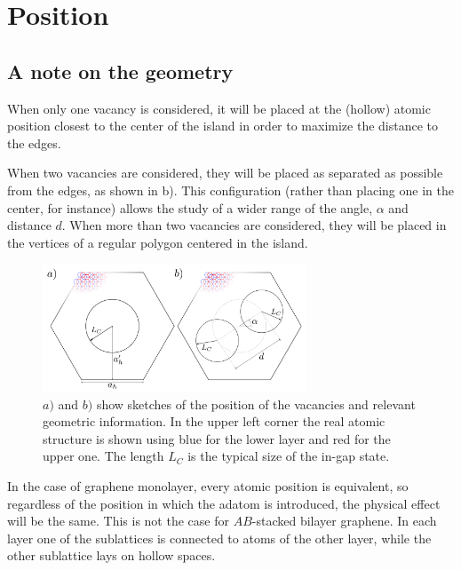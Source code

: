 \section{Position}
\subsection{A note on the geometry}

When only one vacancy is considered, it will be placed at the (hollow) atomic position closest to the center of the island in order to maximize the distance to the edges.

When two vacancies are considered, they will be placed as separated as possible from the edges, as shown in b). This configuration (rather than placing one in the center, for instance) allows the study of a wider range of the angle, $\alpha$ and distance $d$.
When more than two vacancies are considered, they will be placed in the vertices of a regular polygon centered in the island.


\begin{figure}[h!]
\centering
\includegraphics[width=0.7\textwidth]{artlat/fig/vacs_sketch.pdf}
\vspace{-10pt}
\caption{$a)$ and $b)$ show sketches of the position of the vacancies and relevant geometric information. In the upper left corner the real atomic structure is shown using blue for the lower layer and red for the upper one. The length $L_C$ is the typical size of the in-gap state.} %
\label{geo_sketch}
\end{figure}
\FloatBarrier
In the case of graphene monolayer, every atomic position is equivalent, so regardless of the position in which the adatom is introduced, the physical effect will be the same.
This is not the case for $AB$-stacked bilayer graphene. In each layer one of the sublattices is connected to atoms of the other layer, while the other sublattice lays on hollow spaces.

